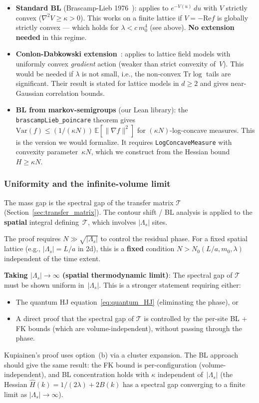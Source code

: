 \documentclass[12pt]{article}
\theoremstyle{definition}
\theoremstyle{remark}
\newcommand{\E}{\mathbb{E}}
\newcommand{\Var}{\mathrm{Var}}
\newcommand{\Tr}{\mathrm{Tr}}
\newcommand{\La}{\Lambda}
\newcommand{\re}{\mathrm{Re}}
\begin{document}
\begin{itemize}
\item \textbf{Standard BL} (Brascamp-Lieb 1976~\cite{BL76}):
  applies to $e^{-V(u)}\,du$ with $V$ strictly convex
  ($\nabla^2 V \ge \kappa > 0$). This works on a finite
  lattice if $V = -\re f$ is globally strictly convex ---
  which holds for $\lambda < c\,m_0^4$ (see above).
  \textbf{No extension needed} in this regime.

\item \textbf{Conlon-Dabkowski extension}~\cite{CD24}:
  applies to lattice field models with uniformly convex
  \emph{gradient} action (weaker than strict convexity of~$V$).
  This would be needed if $\lambda$ is not small, i.e., the
  non-convex $\Tr\log$ tails are significant. Their result
  is stated for lattice models in $d \ge 2$ and gives
  near-Gaussian correlation bounds.

\item \textbf{BL from markov-semigroups} (our Lean library):
  the \texttt{brascampLieb\_poincare} theorem gives
  $\Var(f) \le (1/(\kappa N))\,\E[\|\nabla f\|^2]$ for
  $(\kappa N)$-log-concave measures. This is the version we
  would formalize. It requires \texttt{LogConcaveMeasure}
  with convexity parameter~$\kappa N$, which we construct
  from the Hessian bound~$H \ge \kappa N$.
\end{itemize}

\subsubsection{Uniformity and the infinite-volume limit}
\label{sec:uniformity}

The mass gap is the spectral gap of the transfer matrix
$\mathcal{T}$ (Section~\ref{sec:transfer_matrix}). The contour
shift / BL analysis is applied to the \textbf{spatial} integral
defining~$\mathcal{T}$, which involves $|\La_s|$ sites.

The proof requires $N \gg \sqrt{|\La_s|}$ to control the
residual phase. For a fixed spatial lattice (e.g.,
$|\La_s| = L/a$ in 2d), this is a \textbf{fixed} condition
$N > N_0(L/a, m_0, \lambda)$ independent of the time extent.

\textbf{Taking $|\La_s| \to \infty$ (spatial thermodynamic limit)}:
The spectral gap of $\mathcal{T}$ must be shown uniform in~$|\La_s|$.
This is a stronger statement requiring either:
\begin{itemize}
\item[(a)] The quantum HJ equation~\eqref{eq:quantum_HJ}
  (eliminating the phase), or
\item[(b)] A direct proof that the spectral gap of $\mathcal{T}$
  is controlled by the per-site BL + FK bounds (which are
  volume-independent), without passing through the phase.
\end{itemize}
Kupiainen's proof uses option~(b) via a cluster expansion.
The BL approach should give the same result: the FK bound is
per-configuration (volume-independent), and BL concentration
holds with $\kappa$ independent of~$|\La_s|$ (the Hessian
$\hat{H}(k) = 1/(2\lambda) + 2B(k)$ has a spectral gap
converging to a finite limit as $|\La_s| \to \infty$).
\end{document}

